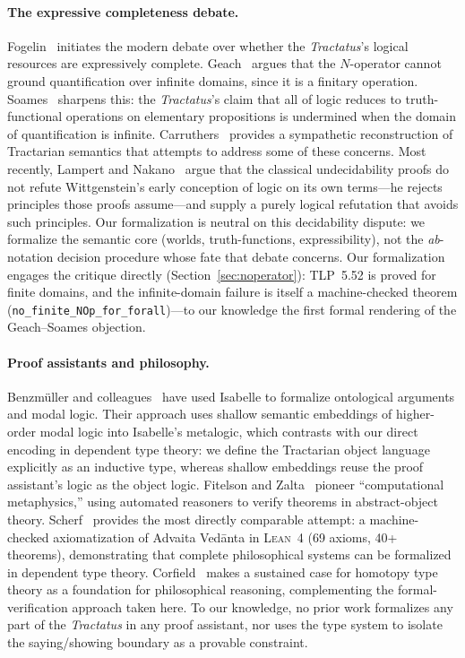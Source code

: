 \documentclass[jsl,bibother]{asl}
\theoremstyle{definition}
\theoremstyle{remark}
\newcommand{\Lean}{\textsc{Lean}}
\begin{document}
\paragraph{The expressive completeness debate.}
Fogelin~\cite{fogelin1987} initiates the modern debate over
whether the \emph{Tractatus}'s logical resources are
expressively complete.  Geach~\cite{geach1981} argues that the
$N$-operator cannot ground quantification over infinite domains,
since it is a finitary operation.
Soames~\cite{soames1983} sharpens this: the \emph{Tractatus}'s
claim that all of logic reduces to truth-functional operations
on elementary propositions is undermined when the domain of
quantification is infinite.
Carruthers~\cite{carruthers1989} provides a sympathetic
reconstruction of Tractarian semantics that attempts to address
some of these concerns.
Most recently, Lampert and Nakano~\cite{lampert2025} argue that
the classical undecidability proofs do not refute Wittgenstein's
early conception of logic on its own terms---he rejects
principles those proofs assume---and supply a purely logical
refutation that avoids such principles.  Our formalization is
neutral on this decidability dispute: we formalize the semantic
core (worlds, truth-functions, expressibility), not the
\emph{ab}-notation decision procedure whose fate that debate
concerns.
Our formalization engages the critique directly
(Section~\ref{sec:noperator}): TLP~5.52 is proved for finite
domains, and the infinite-domain failure is itself a
machine-checked theorem
(\texttt{no\_finite\_NOp\_for\_forall})---to our knowledge the
first formal rendering of the Geach--Soames objection.

\paragraph{Proof assistants and philosophy.}
Benzm\"uller and colleagues~\cite{benzmuller2017} have used
Isabelle to formalize ontological arguments and modal logic.
Their approach uses shallow semantic embeddings of higher-order
modal logic into Isabelle's metalogic, which contrasts with our
direct encoding in dependent type theory: we define the
Tractarian object language explicitly as an inductive type,
whereas shallow embeddings reuse the proof assistant's logic
as the object logic.
Fitelson and Zalta~\cite{fitelson2007} pioneer ``computational
metaphysics,'' using automated reasoners to verify theorems
in abstract-object theory.
Scherf~\cite{scherf2025} provides the most directly comparable
attempt: a machine-checked axiomatization of Advaita Ved\=anta in
\Lean~4 (69 axioms, 40+ theorems), demonstrating that complete
philosophical systems can be formalized in dependent type
theory.
Corfield~\cite{corfield2020} makes a sustained case for
homotopy type theory as a foundation for philosophical
reasoning, complementing the formal-verification approach
taken here.
To our knowledge, no prior work formalizes any part of the
\emph{Tractatus} in any proof assistant, nor uses the type
system to isolate the saying/showing boundary as a provable
constraint.
\end{document}
